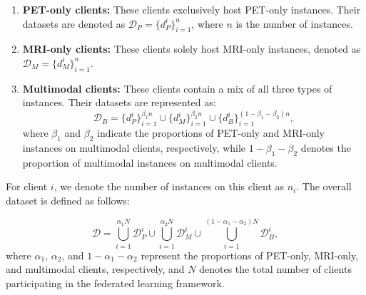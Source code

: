 \begin{enumerate}
    \item \textbf{PET-only clients:} These clients exclusively host PET-only instances. Their datasets are denoted as \( \mathcal{D}_P = \bigl\{d_P^i\bigr\}_{i=1}^{n} \), where \( n \) is the number of instances.

    \item \textbf{MRI-only clients:} These clients solely host MRI-only instances, denoted as \( \mathcal{D}_M = \bigl\{d_M^i\bigr\}_{i=1}^{n} \).

    \item \textbf{Multimodal clients:} These clients contain a mix of all three types of instances. Their datasets are represented as:
    \[
    \mathcal{D}_B = \bigl\{d_P^i\bigr\}_{i=1}^{\beta_1 n} \cup \bigl\{d_M^i\bigr\}_{i=1}^{\beta_2 n} \cup \bigl\{d_B^i\bigr\}_{i=1}^{(1-\beta_1-\beta_2)n},
    \]
    where \( \beta_1 \) and \( \beta_2 \) indicate the proportions of PET-only and MRI-only instances on multimodal clients, respectively, while \( 1-\beta_1-\beta_2 \) denotes the proportion of multimodal instances on multimodal clients.
\end{enumerate}

For client $i$, we denote the number of instances on this client as $n_i$. The overall dataset is defined as follows:

\begin{equation}
    \mathcal{D} = \bigcup_{i=1}^{\alpha_1 N} \mathcal{D}_P^i \cup \bigcup_{i=1}^{\alpha_2 N} \mathcal{D}_M^i \cup \bigcup_{i=1}^{(1-\alpha_1-\alpha_2) N} \mathcal{D}_B^i,
\end{equation}
where \( \alpha_1 \), \( \alpha_2 \), and \( 1-\alpha_1-\alpha_2 \) represent the proportions of PET-only, MRI-only, and multimodal clients, respectively, and \( N \) denotes the total number of clients participating in the federated learning framework.









